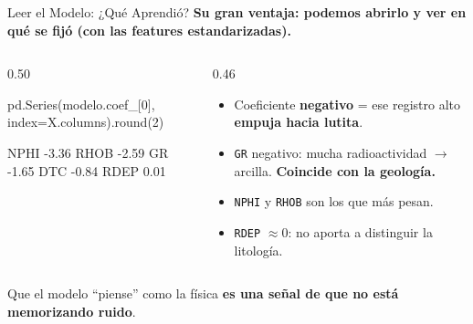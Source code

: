 \documentclass[aspectratio=169, 11pt]{beamer}
\begin{document}
\begin{frame}[fragile,shrink=22]{Leer el Modelo: ¿Qué Aprendió?}
  \vspace{-4pt}
  {\small\color{arcaDark}\bfseries
    Su gran ventaja: podemos \textbf{abrirlo} y ver en qué se fijó (con las features estandarizadas).}

  \vspace{4pt}
  \begin{columns}[T]
    \begin{column}{0.50\textwidth}
      \begin{pyblock}
pd.Series(modelo.coef_[0],
          index=X.columns).round(2)
      \end{pyblock}
      \vspace{2pt}
      \begin{outputblock}
NPHI    -3.36
RHOB    -2.59
GR      -1.65
DTC     -0.84
RDEP     0.01
      \end{outputblock}
    \end{column}
    \begin{column}{0.46\textwidth}
      {\scriptsize\color{textMuted}
      \begin{itemize}\setlength{\itemsep}{4pt}
        \item[{\color{arcaRed}\scriptsize\faArrowRight}]
          Coeficiente \textbf{negativo} = ese registro alto
          \textbf{empuja hacia lutita}.
        \item[{\color{codeGreen}\scriptsize\faCheck}]
          \texttt{GR} negativo: mucha radioactividad
          \(\to\) arcilla. \textbf{Coincide con la geología.}
        \item[{\color{codeGreen}\scriptsize\faCheck}]
          \texttt{NPHI} y \texttt{RHOB} son los que más pesan.
        \item[{\color{arcaRed}\scriptsize\faTimes}]
          \texttt{RDEP} \(\approx 0\): no aporta a distinguir
          la litología.
      \end{itemize}
      }
    \end{column}
  \end{columns}

  \vspace{3pt}
  {\scriptsize\color{arcaDark}
    \faLightbulb[regular]\hspace{3pt}%
    Que el modelo ``piense'' como la física \textbf{es una señal de que no está memorizando ruido}.}
\end{frame}
\end{document}
